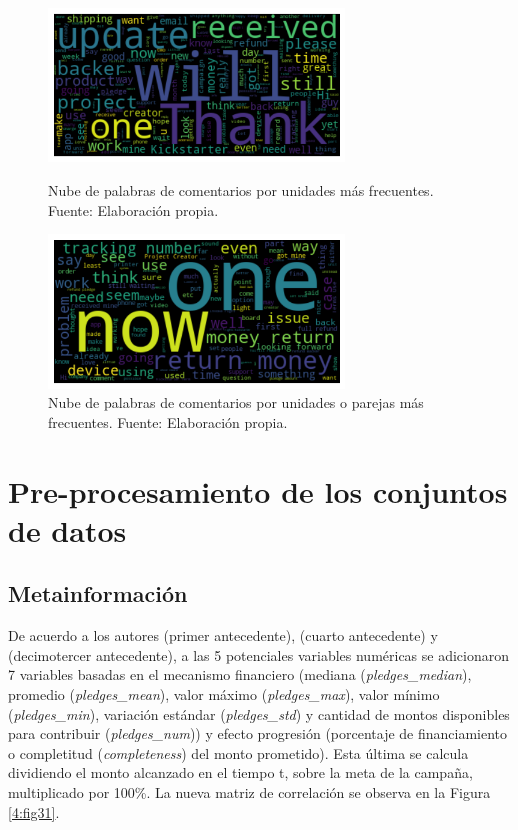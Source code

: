 \begin{figure}[htbp]
	\begin{center}
		\includegraphics[width=0.70\textwidth]{4/figures/comments_wordcloud_wordunit.png}
		\caption{Nube de palabras de comentarios por unidades más frecuentes. Fuente: Elaboración propia.}
		\label{4:fig29}
		
		\includegraphics[width=0.70\textwidth]{4/figures/comments_wordcloud_wordcouple.png}
		\caption{Nube de palabras de comentarios por unidades o parejas más frecuentes. Fuente: Elaboración propia.}
		\label{4:fig30}
	\end{center}
\end{figure}

\section{Pre-procesamiento de los conjuntos de datos}

\subsection{Metainformación}
De acuerdo a los autores \citeauthor{pr_chen2013kickpredict} (primer antecedente), \citeauthor{pr_chen2015predcrowd} (cuarto antecedente) y \citeauthor{pr_jin2019dayssuccess} (decimotercer antecedente), a las 5 potenciales variables numéricas se adicionaron 7 variables basadas en el mecanismo financiero (mediana (\textit{pledges\_median}), promedio (\textit{pledges\_mean}), valor máximo (\textit{pledges\_max}), valor mínimo (\textit{pledges\_min}), variación estándar (\textit{pledges\_std}) y cantidad de montos disponibles para contribuir (\textit{pledges\_num})) y efecto progresión (porcentaje de financiamiento o completitud (\textit{completeness}) del monto prometido). Esta última se calcula dividiendo el monto alcanzado en el tiempo t, sobre la meta de la campaña, multiplicado por 100\%. La nueva matriz de correlación se observa en la Figura \ref{4:fig31}.

